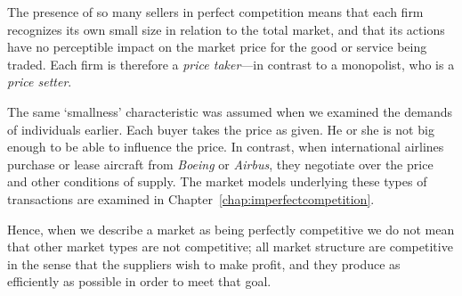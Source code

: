 \newhtmlpage

The presence of so many sellers in perfect competition means that each firm
recognizes its own small size in relation to the total market, and that its
actions have no perceptible impact on the market price for the good or
service being traded. Each firm is therefore a \textit{price taker}---in
contrast to a monopolist, who is a \textit{price setter}.

The same `smallness' characteristic was assumed when we examined the demands
of individuals earlier. Each buyer takes the price as given. He or she is
not big enough to be able to influence the price. In contrast, when
international airlines purchase or lease aircraft from \textit{Boeing} or 
\textit{Airbus}, they negotiate over the price and other conditions of
supply. The market models underlying these types of transactions are
examined in Chapter~\ref{chap:imperfectcompetition}.

Hence, when we describe a market as being perfectly competitive we do not
mean that other market types are not competitive; all market structure are
competitive in the sense that the suppliers wish to make profit, and they
produce as efficiently as possible in order to meet that goal.
